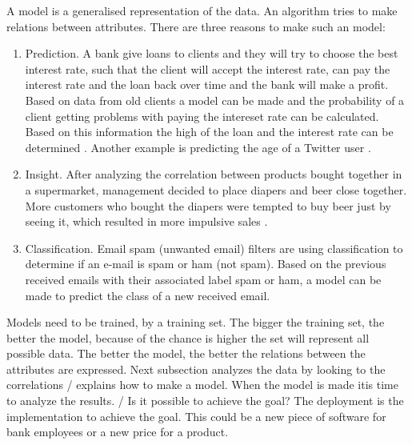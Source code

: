 	A model is a generalised representation of the data. An algorithm tries to make relations between attributes. There are three reasons to make such an model:
	\begin{enumerate}
		\item Prediction. A bank give loans to clients and they will try to choose the best interest rate, such that the client will accept the interest rate, can pay the interest rate and the loan back over time and the bank will make a profit. Based on data from old clients a model can be made and the probability of a client getting problems with paying the intereset rate can be calculated. Based on this information the high of the loan and the interest rate can be determined \cite{credit}. Another example is predicting the age of a Twitter user \cite{tweetgenie}.		
		\item Insight. After analyzing the correlation between products bought together in a supermarket, management decided to place diapers and beer close together. More customers who bought the diapers were tempted to buy beer just by seeing it, which resulted in more impulsive sales \cite{beer}.
		\item Classification. Email spam (unwanted email) filters are using classification to determine if an e-mail is spam or ham (not spam). Based on the previous received emails with their associated label spam or ham, a model can be made to predict the class of a new received email. 
	\end{enumerate}
	Models need to be trained, by a training set. The bigger the training set, the better the model, because of the chance is higher the set will represent all possible data. The better the model, the better the relations between the attributes are expressed. Next subsection analyzes the data by looking to the correlations / explains how to make a model. When the model is made itis time to analyze the results. / Is it possible to achieve the goal? The deployment is the implementation to achieve the goal. This could be a new piece of software for bank employees or a new price for a product. 

